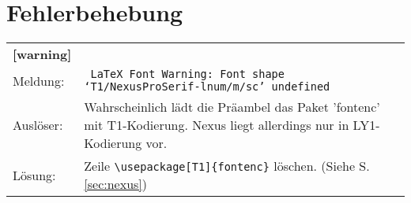 \chapter{Fehlerbehebung}

\newcommand\errormsg[5][error]{%
    \begin{tabularx}{\textwidth}{lX}%
      \sffamily\textbf{[#1]}\\
      Meldung: & \texttt{#2}\\
      Auslöser: & #3\\
      Lösung: & #4 (Siehe S. \ref{#5})%
    \end{tabularx}%
}

\errormsg[warning]{%
  LaTeX Font Warning: Font shape `T1/NexusProSerif-lnum/m/sc' undefined
}{%
  Wahrscheinlich lädt die Präambel das Paket 'fontenc' mit T1-Kodierung.
  Nexus liegt allerdings nur in LY1-Kodierung vor.
}{%
  Zeile \texttt{\textbackslash usepackage[T1]\{fontenc\}} löschen.
}{sec:nexus}



